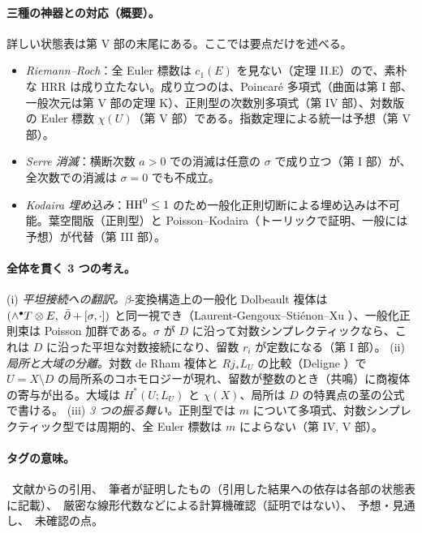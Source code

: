 \paragraph{三種の神器との対応（概要）。}
詳しい状態表は第 V 部の末尾にある。ここでは要点だけを述べる。
\begin{itemize}
\item \emph{Riemann--Roch}：全 Euler 標数は $c_1(E)$ を見ない（定理 II.E）ので、素朴な HRR は成り立たない。成り立つのは、Poincar\'e 多項式（曲面は第 I 部、一般次元は第 V 部の定理 K）、正則型の次数別多項式（第 IV 部）、対数版の Euler 標数 $\chi(U)$（第 V 部）である。指数定理による統一は予想（第 V 部）。
\item \emph{Serre 消滅}：横断次数 $a>0$ での消滅は任意の $\sigma$ で成り立つ（第 I 部）が、全次数での消滅は $\sigma=0$ でも不成立。
\item \emph{Kodaira 埋め込み}：$\mathrm{HH}^0\le1$ のため一般化正則切断による埋め込みは不可能。葉空間版（正則型）と Poisson--Kodaira（トーリックで証明、一般には予想）が代替（第 III 部）。
\end{itemize}

\paragraph{全体を貫く 3 つの考え。}
(i) \emph{平坦接続への翻訳。}$\beta$-変換構造上の一般化 Dolbeault 複体は $(\wedge^\bullet T\otimes E,\ \dbar+[\sigma,\cdot])$ と同一視でき\tC（Laurent-Gengoux--Sti\'enon--Xu \cite{LGSX1}）、一般化正則束は Poisson 加群である。$\sigma$ が $D$ に沿って対数シンプレクティックなら、これは $D$ に沿った平坦な対数接続になり、留数 $r_i$ が定数になる（第 I 部）。
(ii) \emph{局所と大域の分離。}対数 de Rham 複体と $Rj_*L_U$ の比較（Deligne \cite{Del}）で $U=X\setminus D$ の局所系のコホモロジーが現れ、留数が整数のとき（共鳴）に商複体の寄与が出る。大域は $H^*(U;L_U)$ と $\chi(X)$、局所は $D$ の特異点の茎の公式で書ける。
(iii) \emph{3 つの振る舞い。}正則型では $m$ について多項式、対数シンプレクティック型では周期的、全 Euler 標数は $m$ によらない（第 IV, V 部）。

\paragraph{タグの意味。}\tC\ 文献からの引用、\tP\ 筆者が証明したもの（引用した結果への依存は各部の状態表に記載）、\tV\ 厳密な線形代数などによる計算機確認（証明ではない）、\tK\ 予想・見通し、\tQ\ 未確認の点。

